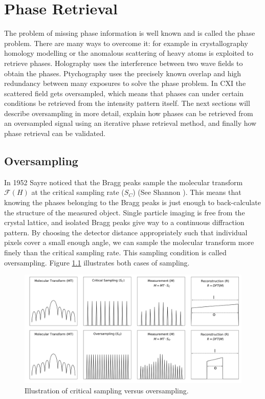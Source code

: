 \chapter{Phase Retrieval}
The problem of missing phase information is well known and is called the phase problem. There are many ways to overcome it: for example in crystallography homology modelling or the anomalous scattering of heavy atoms is exploited to retrieve phases. Holography uses the interference between two wave fields to obtain the phases. Ptychography uses the precisely known overlap and high redundancy between many exposures to solve the phase problem. In CXI the scattered field gets oversampled, which means that phases can under certain conditions be retrieved from the intensity pattern itself. The next sections will describe oversampling in more detail, explain how phases can be retrieved from an oversampled signal using an iterative phase retrieval method, and finally how phase retrieval can be validated. 

\section{Oversampling} 
In 1952 Sayre noticed that the Bragg peaks sample the molecular transform $\mathcal{F}(H)$ at the critical sampling rate ($S_C$)\cite{Sayre1952a} (See Shannon \cite{Shannon1949a}). This means that knowing the phases belonging to the Bragg peaks is just enough to back-calculate the structure of the measured object. Single particle imaging is free from the crystal lattice, and isolated Bragg peaks give way to a continuous diffraction pattern. By choosing the detector distance appropriately such that individual pixels cover a small enough angle, we can sample the molecular transform more finely than the critical sampling rate. This sampling condition is called oversampling. Figure \ref{fig:sampling} illustrates both cases of sampling. 

\begin{figure}[h]
	\centering 
		\includegraphics[width=120mm]{sampling.png}
	\caption{Illustration of critical sampling versus 		oversampling.}
	\label{fig:sampling}
\end{figure}

